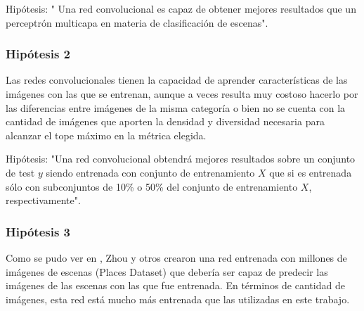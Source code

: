 Hipótesis: " Una red convolucional es capaz de obtener mejores resultados que un perceptrón multicapa en materia de clasificación de escenas".

\subsubsection{Hipótesis 2} \label{sssec:hipotesis2}
Las redes convolucionales tienen la capacidad de aprender características de las imágenes con las que se entrenan, aunque a veces resulta muy costoso hacerlo por las diferencias entre imágenes de la misma categoría o bien no se cuenta con la cantidad de imágenes que aporten la densidad y diversidad necesaria para alcanzar el tope máximo en la métrica elegida. 

Hipótesis: "Una red convolucional obtendrá mejores resultados sobre un conjunto de test \(y\) siendo entrenada con conjunto de entrenamiento \(X\) que si es entrenada sólo con subconjuntos de 10\% o 50\% del conjunto de entrenamiento \(X\), respectivamente".


\subsubsection{Hipótesis 3} \label{sssec:hipotesis3}
Como se pudo ver en \cite{learning_deep_features}, Zhou y otros crearon una red entrenada con millones de imágenes de escenas (Places Dataset) que debería ser capaz de predecir las imágenes de las escenas con las que fue entrenada. En términos de cantidad de imágenes, esta red está mucho más entrenada que las utilizadas en este trabajo. 


